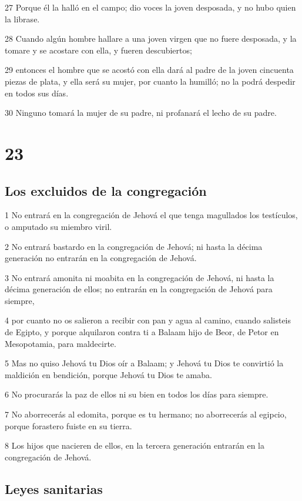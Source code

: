 \par 27 Porque él la halló en el campo; dio voces la joven desposada, y no hubo quien la librase.
\par 28 Cuando algún hombre hallare a una joven virgen que no fuere desposada, y la tomare y se acostare con ella, y fueren descubiertos;
\par 29 entonces el hombre que se acostó con ella dará al padre de la joven cincuenta piezas de plata, y ella será su mujer, por cuanto la humilló; no la podrá despedir en todos sus días. 
\par 30 Ninguno tomará la mujer de su padre, ni profanará el lecho de su padre.

\chapter{23}

\section{Los excluidos de la congregación}

\par 1 No entrará en la congregación de Jehová el que tenga magullados los testículos, o amputado su miembro viril.
\par 2 No entrará bastardo en la congregación de Jehová; ni hasta la décima generación no entrarán en la congregación de Jehová.
\par 3 No entrará amonita ni moabita en la congregación de Jehová, ni hasta la décima generación de ellos; no entrarán en la congregación de Jehová para siempre,
\par 4 por cuanto no os salieron a recibir con pan y agua al camino, cuando salisteis de Egipto, y porque alquilaron contra ti a Balaam hijo de Beor, de Petor en Mesopotamia, para maldecirte.
\par 5 Mas no quiso Jehová tu Dios oír a Balaam; y Jehová tu Dios te convirtió la maldición en bendición, porque Jehová tu Dios te amaba.
\par 6 No procurarás la paz de ellos ni su bien en todos los días para siempre.
\par 7 No aborrecerás al edomita, porque es tu hermano; no aborrecerás al egipcio, porque forastero fuiste en su tierra.
\par 8 Los hijos que nacieren de ellos, en la tercera generación entrarán en la congregación de Jehová.

\section{Leyes sanitarias}


